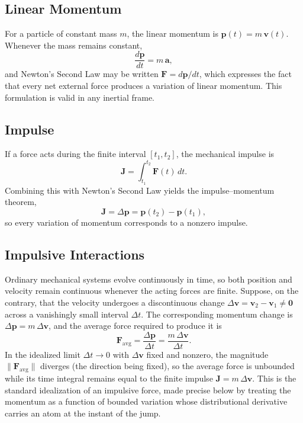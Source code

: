 \documentclass[11pt]{article}
\begin{document}
	\subsection{Linear Momentum}
	
	For a particle of constant mass $m$, the linear momentum is
	$\mathbf p(t)=m\,\mathbf v(t)$. Whenever the mass remains constant,
	\[
	\frac{d\mathbf p}{dt}=m\,\mathbf a,
	\]
	and Newton's Second Law may be written $\mathbf F=d\mathbf p/dt$, which
	expresses the fact that every net external force produces a variation
	of linear momentum. This formulation is valid in any inertial frame.
	
	\subsection{Impulse}
	
	If a force acts during the finite interval $[t_1,t_2]$, the mechanical
	impulse is
	\[
	\mathbf J=\int_{t_1}^{t_2}\mathbf F(t)\,dt.
	\]
	Combining this with Newton's Second Law yields the impulse--momentum
	theorem,
	\[
	\mathbf J=\Delta\mathbf p=\mathbf p(t_2)-\mathbf p(t_1),
	\]
	so every variation of momentum corresponds to a nonzero impulse.
	
	\subsection{Impulsive Interactions}
	\label{subsec:impulsive}
	
	Ordinary mechanical systems evolve continuously in time, so both
	position and velocity remain continuous whenever the acting forces are
	finite. Suppose, on the contrary, that the velocity undergoes a
	discontinuous change $\Delta\mathbf v=\mathbf v_2-\mathbf v_1\neq
	\mathbf 0$ across a vanishingly small interval $\Delta t$. The
	corresponding momentum change is $\Delta\mathbf p=m\,\Delta\mathbf v$,
	and the average force required to produce it is
	\[
	\mathbf F_{\mathrm{avg}}=\frac{\Delta\mathbf p}{\Delta t}
	=\frac{m\,\Delta\mathbf v}{\Delta t}.
	\]
	In the idealized limit $\Delta t\to 0$ with $\Delta\mathbf v$ fixed and
	nonzero, the magnitude $\|\mathbf F_{\mathrm{avg}}\|$ diverges (the
	direction being fixed), so the average force is unbounded while its
	time integral remains equal to the finite impulse
	$\mathbf J=m\,\Delta\mathbf v$. This is the standard idealization of an
	impulsive force, made precise below by treating the momentum as a
	function of bounded variation whose distributional derivative carries
	an atom at the instant of the jump.
	
\end{document}
